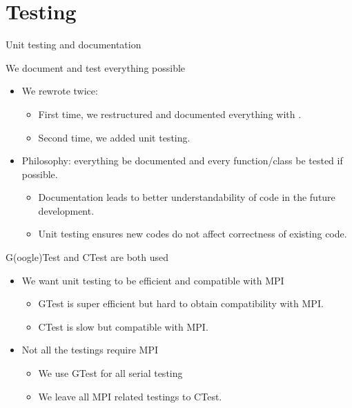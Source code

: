 \section[Unit Testing, documentation Continuous Integration and Code Coverage]{Testing}
\begin{frame}{Unit testing and documentation}
	\begin{block}{We document and test everything possible}
		\begin{itemize}
			\item We rewrote  twice:
			\begin{itemize}
					\item First time, we restructured  and documented everything with .
					\item Second time, we added unit testing.
			\end{itemize}
			\item Philosophy: everything be documented and every function/class be tested if possible.
			\begin{itemize}
				\item Documentation leads to better understandability of code in the future development.
				\item Unit testing ensures new codes do not affect correctness of existing code.
			\end{itemize}
		\end{itemize}
	\end{block}
	
	\begin{block}{G(oogle)Test and CTest are both used}
		\begin{itemize}
			\item We want unit testing to be efficient and compatible with MPI
			\begin{itemize}
				\item GTest is super efficient but hard to obtain compatibility with MPI.
				\item CTest is slow but compatible with MPI.
			\end{itemize}
			\item Not all the testings require MPI
			\begin{itemize}
				\item We use GTest for all serial testing
				\item We leave all MPI related testings to CTest.
			\end{itemize}
		\end{itemize}
	\end{block}
\end{frame}
